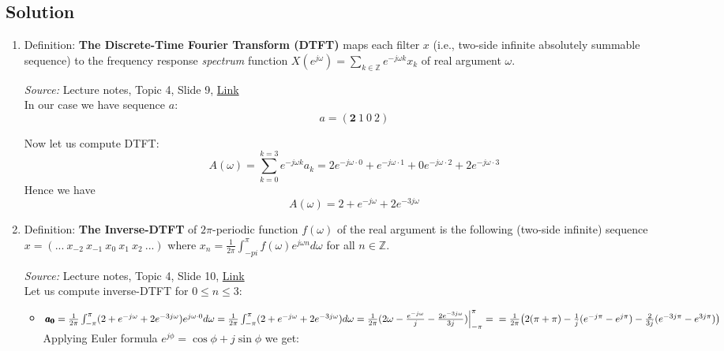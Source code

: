 \documentclass{article}
\begin{document}
\subsection{Solution}
\begin{enumerate}
    \item Definition: \textbf{The Discrete-Time Fourier Transform (DTFT)} maps each filter $x$ (i.e., two-side infinite absolutely summable sequence) to the frequency response \textit{spectrum} function $X(e^{j\omega})=\sum_{k\in\mathbb{Z}}e^{-j\omega k}x_k$ of real argument $\omega$.
    
    \emph{Source:} Lecture notes, Topic 4, Slide 9, \href{https://moodle.innopolis.university/pluginfile.php/143329/mod_resource/content/1/DSPt4spr21.pdf}{Link}\\
    
    In our case we have sequence $a$:
    $$a=(\pmb{2}\ 1\ 0\ 2)$$
    
    Now let us compute DTFT:
    $$A(\omega)=\sum^{k=3}_{k=0}e^{-j\omega k}a_k=2e^{-j\omega\cdot0}+e^{-j\omega\cdot1}+0e^{-j\omega\cdot2}+2e^{-j\omega\cdot3}$$
    Hence we have
    $$A(\omega)=2+e^{-j\omega}+2e^{-3j\omega}$$
    
    \item Definition: \textbf{The Inverse-DTFT} of $2\pi$-periodic function $f(\omega)$ of the real argument is the following (two-side infinite) sequence $x=(...\ x_{-2}\ x_{-1}\ x_0\ x_1\ x_2\ ...)$ where $x_n=\frac{1}{2\pi}\int^{\pi}_{-pi}f(\omega)e^{j\omega n}d\omega$ for all $n\in\mathbb{Z}$.
    
    \emph{Source:} Lecture notes, Topic 4, Slide 10, \href{https://moodle.innopolis.university/pluginfile.php/143329/mod_resource/content/1/DSPt4spr21.pdf}{Link}\\
    
    Let us compute inverse-DTFT for $0\leq n\leq3$:
    \begin{itemize}
        \item $\pmb{a_0}=\frac{1}{2\pi}\int^{\pi}_{-\pi}(2+e^{-j\omega}+2e^{-3j\omega})e^{j\omega\cdot0}d\omega=
        \frac{1}{2\pi}\int^{\pi}_{-\pi}(2+e^{-j\omega}+2e^{-3j\omega})d\omega=
        \frac{1}{2\pi}(2\omega-\frac{e^{-j\omega}}{j}-\frac{2e^{-3j\omega}}{3j})\Big|^{\pi}_{-\pi}=\\
        =\frac{1}{2\pi}\big(2(\pi+\pi)-\frac{1}{j}(e^{-j\pi}-e^{j\pi})-\frac{2}{3j}(e^{-3j\pi}-e^{3j\pi})\big)$\\
        
        Applying Euler formula $e^{j\phi}=\cos{\phi}+j\sin{\phi}$ we get:
        

\end{itemize}
\end{enumerate}
\end{document}
